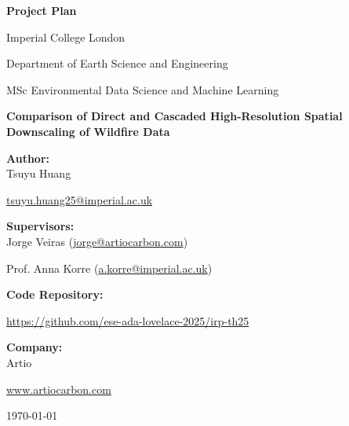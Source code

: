 \documentclass[a4paper, 11pt]{article}
\begin{document}
\begin{titlepage}
    \centering
    \vspace*{1cm}
    
    {\Large\bfseries Project Plan \par}
    \vspace{0.5cm}
    {\large Imperial College London \par}
    {\large Department of Earth Science and Engineering \par} 
    {\large MSc Environmental Data Science and Machine Learning \par} 
    
    \vspace{2.5cm}
    
    {\LARGE\bfseries Comparison of Direct and Cascaded High-Resolution Spatial Downscaling of Wildfire Data \par}
    
    \vspace{3cm}
    
    {\large\bfseries Author:} \\
    {\large Tsuyu Huang} \\
    {\small \href{mailto:tsuyu.huang25@imperial.ac.uk}{tsuyu.huang25@imperial.ac.uk} \par} 
    
    \vspace{1.5cm}
    
    {\large\bfseries Supervisors:} \\
    {\large Jorge Veiras (\href{mailto:jorge@artiocarbon.com}{jorge@artiocarbon.com})} \\
    {\large Prof. Anna Korre (\href{mailto:a.korre@imperial.ac.uk}{a.korre@imperial.ac.uk}) \par}

    \vspace{1.5cm}
    
    {\large\bfseries Code Repository:} \\
    {\small \url{https://github.com/ese-ada-lovelace-2025/irp-th25} \par} 

    \vspace{1.5cm}
    
    {\large\bfseries Company:} \\
    {\large Artio} \\
    {\small \href{https://www.artiocarbon.com/}{www.artiocarbon.com} \par}
    
    \vfill
    
    {\large \today \par}
\end{titlepage}
\end{document}

